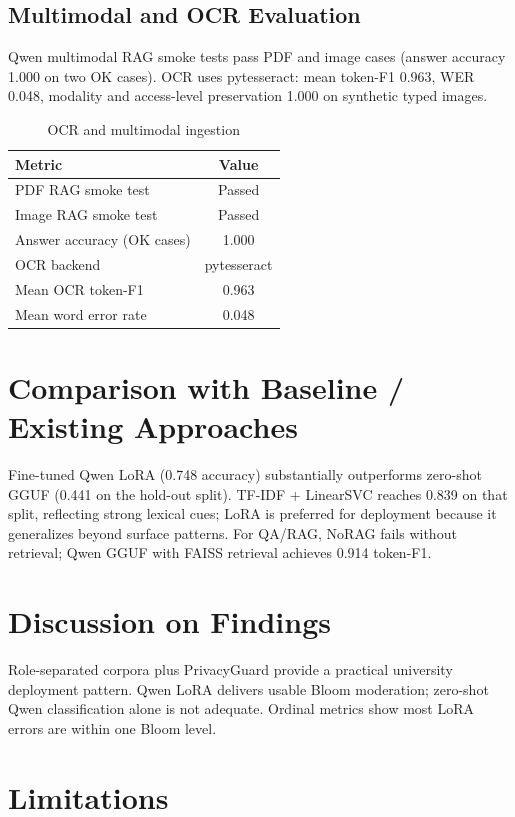 \subsection{Multimodal and OCR Evaluation}

Qwen multimodal RAG smoke tests pass PDF and image cases (answer accuracy 1.000 on two OK cases). OCR uses pytesseract: mean token-F1 0.963, WER 0.048, modality and access-level preservation 1.000 on synthetic typed images.

\begin{table}[H]
\centering
\small
\caption{OCR and multimodal ingestion}
\label{tab:ocr_report}
\begin{tabular}{@{}lc@{}}
\toprule
\textbf{Metric} & \textbf{Value}\\
\midrule
PDF RAG smoke test & Passed\\
Image RAG smoke test & Passed\\
Answer accuracy (OK cases) & 1.000\\
OCR backend & pytesseract\\
Mean OCR token-F1 & 0.963\\
Mean word error rate & 0.048\\
\bottomrule
\end{tabular}
\end{table}

\section{Comparison with Baseline / Existing Approaches}

Fine-tuned Qwen LoRA (0.748 accuracy) substantially outperforms zero-shot GGUF (0.441 on the hold-out split). TF-IDF + LinearSVC reaches 0.839 on that split, reflecting strong lexical cues; LoRA is preferred for deployment because it generalizes beyond surface patterns. For QA/RAG, NoRAG fails without retrieval; Qwen GGUF with FAISS retrieval achieves 0.914 token-F1.

\section{Discussion on Findings}

Role-separated corpora plus PrivacyGuard provide a practical university deployment pattern. Qwen LoRA delivers usable Bloom moderation; zero-shot Qwen classification alone is not adequate. Ordinal metrics show most LoRA errors are within one Bloom level.

\section{Limitations}


